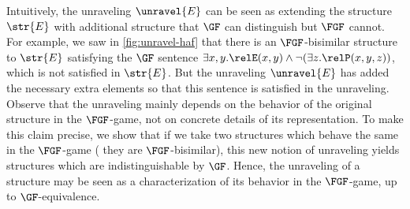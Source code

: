 Intuitively, the unraveling $\unravel{E}$ can be seen as extending the structure $\str{E}$ with additional structure that $\GF$ can distinguish but $\FGF$ cannot.
For example, we saw in \cref{fig:unravel-haf} that there is an $\FGF$-bisimilar structure to $\str{E}$ satisfying the $\GF$ sentence $\exists{x,y}. \relE(x,y) \land \lnot (\exists z. \relP(x,y,z))$, which is not satisfied in $\str{E}$.
But the unraveling $\unravel{E}$ has added the necessary extra elements so that this sentence is satisfied in the unraveling.
Observe that the unraveling mainly depends on the behavior of the original structure in the $\FGF$-game, not on concrete details of its representation.
To make this claim precise, we show that if we take two structures which behave the same in the $\FGF$-game (\ie{} they are $\FGF$-bisimilar), this new notion of unraveling yields structures which are indistinguishable by $\GF$.
Hence, the unraveling of a structure may be seen as a characterization of its behavior in the $\FGF$-game, up to $\GF$-equivalence.

